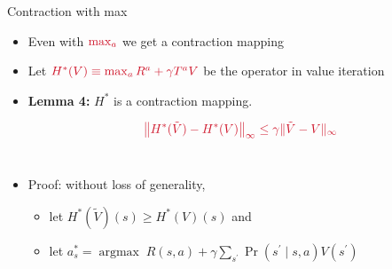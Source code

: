 \documentclass[11pt,table]{beamer}
\begin{document}
\begin{frame}{Contraction with max}

\begin{itemize}
    \item Even with $\textcolor{red1}{\max _{a}}$ we get a contraction mapping
		\item Let $\textcolor{red1}{H^{*}(V) \equiv \max _{a} R^{a}+\gamma T^{a} V}$ be the operator in value iteration

\item \textbf{Lemma 4:} $H^{*}$ is a \textcolor{red1}{contraction mapping}.

$$
\textcolor{red1}{\left\|H^{*}(\tilde{V})-H^{*}(V)\right\|_{\infty} \leq \gamma\|\tilde{V}-V\|_{\infty}}
$$\\

\pause 

\item Proof: without loss of generality,\\[2ex]
\begin{itemize}
    \item let $H^{*}(\tilde{V})(s) \geq H^{*}(V)(s)$ and\\[2ex]
		\item let $a_{s}^{*}=\operatorname{argmax} \; R(s, a)+\gamma \sum_{s^{\prime}} \operatorname{Pr}\left(s^{\prime} \mid s, a\right) V\left(s^{\prime}\right)$
\end{itemize}

\end{itemize}
    
\end{frame}
\end{document}
